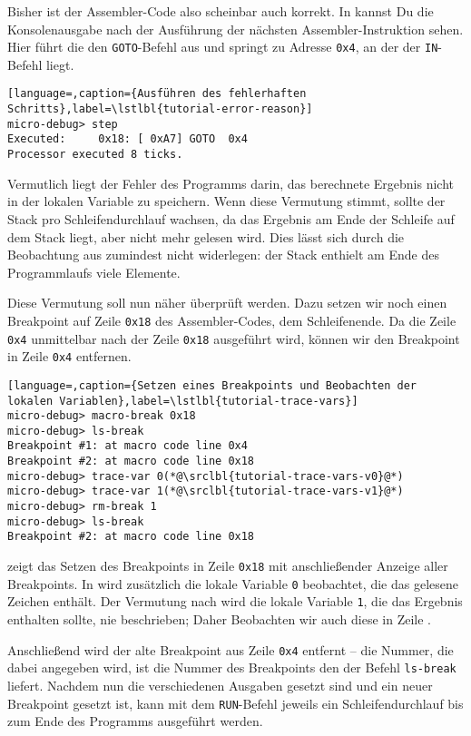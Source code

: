 Bisher ist der Assembler-Code also scheinbar auch korrekt. In  kannst Du die Konsolenausgabe nach der Ausführung der nächsten Assembler-Instruktion sehen. Hier führt die \mic den \texttt{GOTO}-Befehl aus und springt zu Adresse \texttt{0x4}, an der der \texttt{IN}-Befehl liegt.

\begin{lstlisting}[language=,caption={Ausführen des fehlerhaften Schritts},label=\lstlbl{tutorial-error-reason}]
micro-debug> step
Executed:     0x18: [ 0xA7] GOTO  0x4
Processor executed 8 ticks.
\end{lstlisting}

Vermutlich liegt der Fehler des Programms darin, das berechnete Ergebnis nicht in der lokalen Variable zu speichern. Wenn diese Vermutung stimmt, sollte der Stack pro Schleifendurchlauf wachsen, da das Ergebnis am Ende der Schleife auf dem Stack liegt, aber nicht mehr gelesen wird. Dies lässt sich durch die Beobachtung aus  zumindest nicht widerlegen: der Stack enthielt am Ende des Programmlaufs viele Elemente.

Diese Vermutung soll nun näher überprüft werden. Dazu setzen wir noch einen Breakpoint auf Zeile \texttt{0x18} des Assembler-Codes, dem Schleifenende. Da die Zeile \texttt{0x4} unmittelbar nach der Zeile \texttt{0x18} ausgeführt wird, können wir den Breakpoint in Zeile \texttt{0x4} entfernen.

\begin{lstlisting}[language=,caption={Setzen eines Breakpoints und Beobachten der lokalen Variablen},label=\lstlbl{tutorial-trace-vars}]
micro-debug> macro-break 0x18
micro-debug> ls-break
Breakpoint #1: at macro code line 0x4
Breakpoint #2: at macro code line 0x18
micro-debug> trace-var 0(*@\srclbl{tutorial-trace-vars-v0}@*)
micro-debug> trace-var 1(*@\srclbl{tutorial-trace-vars-v1}@*)
micro-debug> rm-break 1
micro-debug> ls-break
Breakpoint #2: at macro code line 0x18
\end{lstlisting}

 zeigt das Setzen des Breakpoints in Zeile \texttt{0x18} mit anschließender Anzeige aller Breakpoints. In  wird zusätzlich die lokale Variable \texttt{0} beobachtet, die das gelesene Zeichen enthält. Der Vermutung nach wird die lokale Variable \texttt{1}, die das Ergebnis enthalten sollte, nie beschrieben; Daher Beobachten wir auch diese in Zeile .

Anschließend wird der alte Breakpoint aus Zeile \texttt{0x4} entfernt -- die Nummer, die dabei angegeben wird, ist die Nummer des Breakpoints den der Befehl \texttt{ls-break} liefert. Nachdem nun die verschiedenen Ausgaben gesetzt sind und ein neuer Breakpoint gesetzt ist, kann mit dem \texttt{RUN}-Befehl jeweils ein Schleifendurchlauf bis zum Ende des Programms ausgeführt werden.

